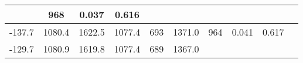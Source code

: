 \documentclass[a4paper,10pt]{article}
\begin{document}
\begin{longtable}{
     |
%    
    c|
%    
    c|
%    
    c|
%    
    c|
%    
    c|
%    
    c|
%    
    c|
%    
    c|
%    
    c|
%    
    c|
%    
    }
%        
        & 968
%        

%        

%        
        & 0.037
%        

%        

%        
        & 0.616
%        

%        
        \\
        \hline

        

%        

%        
        -137.7
%        

%        

%        
        & 1080.4
%        

%        

%        
        & 1622.5
%        

%        

%        
        & 1077.4
%        

%        

%        
        & 693
%        

%        

%        
        & 1371.0
%        

%        

%        
        & 964
%        

%        

%        
        & 0.041
%        

%        

%        
        & 0.617
%        

%        
        \\
        \hline

        

%        

%        
        -129.7
%        

%        

%        
        & 1080.9
%        

%        

%        
        & 1619.8
%        

%        

%        
        & 1077.4
%        

%        

%        
        & 689
%        

%        

%        
        & 1367.0
%        

%        


\end{longtable}
\end{document}
